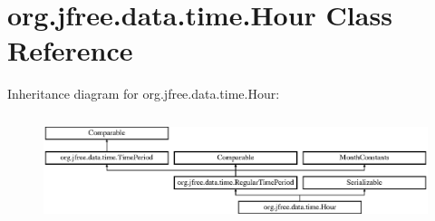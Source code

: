 \hypertarget{classorg_1_1jfree_1_1data_1_1time_1_1_hour}{}\section{org.\+jfree.\+data.\+time.\+Hour Class Reference}
\label{classorg_1_1jfree_1_1data_1_1time_1_1_hour}
Inheritance diagram for org.\+jfree.\+data.\+time.\+Hour\+:\begin{figure}[H]
\begin{center}
\leavevmode
\includegraphics[height=3.190883cm]{classorg_1_1jfree_1_1data_1_1time_1_1_hour}
\end{center}
\end{figure}

